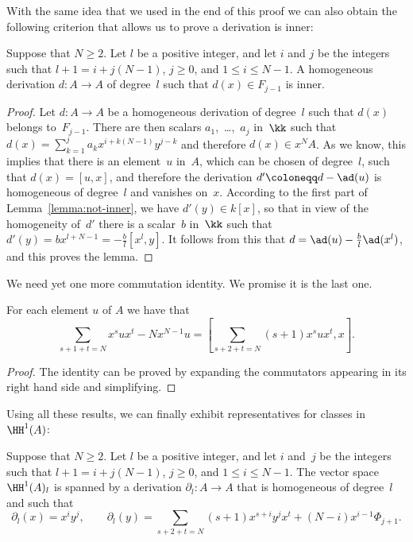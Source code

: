 With the same idea that we used in the end of this proof we can also obtain
the following criterion that allows us to prove a derivation is inner:

\begin{Lemma}\label{lemma:cut}
Suppose that $N\geq2$. Let $l$ be a positive integer, and let $i$ and $j$
be the integers such that $l+1=i+j(N-1)$, $j\geq0$, and $1\leq i\leq N-1$.
A homogeneous derivation $d:A\to A$ of degree~$l$ such that $d(x)\in
F_{j-1}$ is inner.
\end{Lemma}

\begin{proof}
Let $d:A\to A$ be a homogeneous derivation of degree~$l$ such that $d(x)$
belongs to~$F_{j-1}$. There are then scalars $a_1$,~\dots,~$a_j$ in~$\kk$
such that $d(x)=\sum_{k=1}^ja_kx^{i+k(N-1)}y^{j-k}$ and therefore $d(x)\in
x^NA$. As we know, this implies that there is an element~$u$ in~$A$, which
can be chosen of degree~$l$, such that $d(x)=[u,x]$, and therefore the
derivation $d'\coloneqq d-\ad(u)$ is homogeneous of degree~$l$ and vanishes
on~$x$. According to the first part of Lemma~\ref{lemma:not-inner}, we have
$d'(y)\in k[x]$, so that in view of the homogeneity of~$d'$ there is a
scalar~$b$ in~$\kk$ such that $d'(y)=bx^{l+N-1}=-\frac{b}{l}[x^{l},y]$.
It follows from this that $d=\ad(u)-\frac{b}{l}\ad(x^{l})$, and this
proves the lemma.
\end{proof}

We need yet one more commutation identity. We promise it is the last one.

\begin{Lemma}\label{lemma:identity}
For each element $u$ of $A$ we have that
  \begin{equation*}
  \sum_{s+1+t=N}x^sux^t - Nx^{N-1}u
        = \left[
          \sum_{s+2+t=N}(s+1)x^sux^t,x
          \right].
  \end{equation*}
\end{Lemma}

\begin{proof}
The identity can be proved by expanding the commutators
appearing in its right hand side and simplifying.
\end{proof}

Using all these results, we can finally exhibit representatives for classes
in~$\HH^1(A)$:

\begin{Proposition}\label{prop:hh1-high}
Suppose that $N\geq2$. Let $l$ be a positive integer, and let $i$ and~$j$
be the integers such that $l+1=i+j(N-1)$, $j\geq0$, and $1\leq i\leq N-1$.
The vector space~$\HH^1(A)_l$ is spanned by a derivation $\partial_l:A\to
A$ that is homogeneous of degree~$l$ and such that
  \[
  \partial_l(x) = x^iy^j,
  \qquad
  \partial_l(y) = \sum_{s+2+t=N}(s+1)x^{s+i}y^jx^t + (N-i)x^{i-1}\Phi_{j+1}.
  \]
\end{Proposition}

